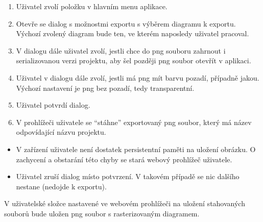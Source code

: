 \ucnormal{}
\begin{enumerate}
  \item Uživatel zvolí položku  v hlavním menu aplikace.
  \item Otevře se dialog s možnostmi exportu s výběrem diagramu k exportu. Výchozí zvolený diagram bude ten, ve kterém naposledy uživatel pracoval.
  \item V dialogu dále uživatel zvolí, jestli chce do \acrshort{png} souboru zahrnout i serializovanou verzi projektu, aby šel později \acrshort{png} soubor otevřít v aplikaci.
  \item Uživatel v dialogu dále zvolí, jestli má \acrshort{png} mít barvu pozadí, případně jakou. Výchozí nastavení je \acrshort{png} bez pozadí, tedy transparentní.
  \item Uživatel potvrdí dialog.
  \item V prohlížeči uživatele se \enquote{stáhne} exportovaný \acrshort{png} soubor, který má název odpovídající názvu projektu.
\end{enumerate}

\ucerrors{}
\begin{itemize}
  \item V zařízení uživatele není dostatek persistentní paměti na uložení obrázku. O zachycení a obstarání této chyby se stará webový prohlížeč uživatele.
  \item Uživatel zruší dialog místo potvrzení. V takovém případě se nic dalšího nestane (nedojde k exportu).
\end{itemize}

\ucend{}
V uživatelské složce nastavené ve webovém prohlížeči na uložení stahovaných souborů bude uložen \acrshort{png} soubor s rasterizovaným diagramem.
